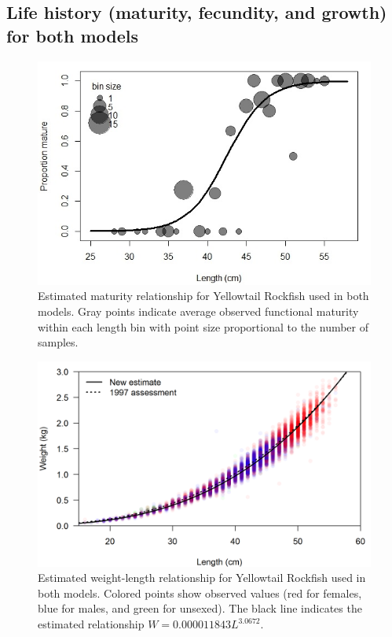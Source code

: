 \documentclass[12pt,]{article}
\begin{document}
\newpage

\subsection{Life history (maturity, fecundity, and growth) for both
models}\label{life-history-maturity-fecundity-and-growth-for-both-models}

\begin{figure}[htbp]
\centering
\includegraphics{Figures/YT_Propmat_update3_22.jpeg}
\caption{Estimated maturity relationship for Yellowtail Rockfish used in
both models. Gray points indicate average observed functional maturity
within each length bin with point size proportional to the number of
samples.\label{fig:maturity}}
\end{figure}

\begin{figure}[htbp]
\centering
\includegraphics{Figures/weight-length_fit.png}
\caption{Estimated weight-length relationship for Yellowtail Rockfish
used in both models. Colored points show observed values (red for
females, blue for males, and green for unsexed). The black line
indicates the estimated relationship
\(W = 0.000011843L^{3.0672}\).\label{fig:weight-length}}
\end{figure}
\end{document}
